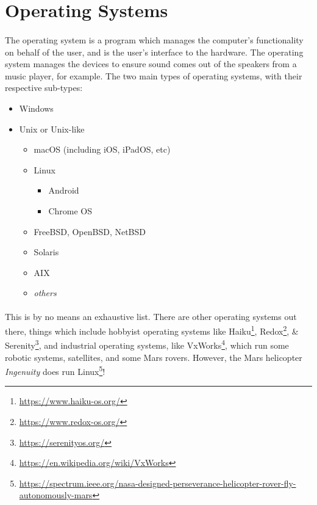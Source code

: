 \documentclass[letter,11pt]{article}
\begin{document}
\section{Operating Systems}
\paragraph{}The operating system is a program which manages the computer's functionality on behalf of the user, and is the user's interface to the hardware. The operating system manages the devices to ensure sound comes out of the speakers from a music player, for example. The two main types of operating systems, with their respective sub-types:
\begin{itemize}
    \item Windows
    \item Unix or Unix-like
    \begin{itemize}
        \item macOS (including iOS, iPadOS, etc)
        \item Linux
        \begin{itemize}
            \item Android
            \item Chrome OS
        \end{itemize}
        \item FreeBSD, OpenBSD, NetBSD
        \item Solaris
        \item AIX
        \item \textit{others}
    \end{itemize}
\end{itemize}

\paragraph{}This is by no means an exhaustive list. There are other operating systems out there, things which include hobbyist operating systems like Haiku\footnote{\url{https://www.haiku-os.org/}}, Redox\footnote{\url{https://www.redox-os.org/}}, \& Serenity\footnote{\url{https://serenityos.org/}}, and industrial operating systems, like VxWorks\footnote{\url{https://en.wikipedia.org/wiki/VxWorks}}, which run some robotic systems, satellites, and some Mars rovers. However, the Mars helicopter \textit{Ingenuity} does run Linux\footnote{\url{https://spectrum.ieee.org/nasa-designed-perseverance-helicopter-rover-fly-autonomously-mars}}!
\end{document}
